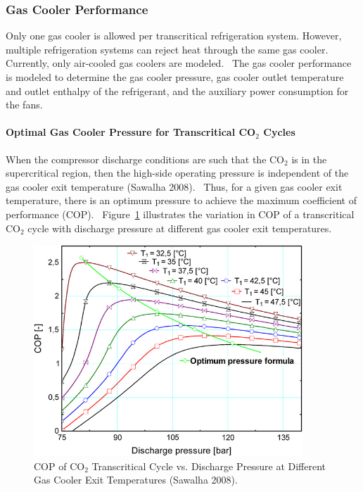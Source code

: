 \subsubsection{Gas Cooler Performance}\label{gas-cooler-performance}

Only one gas cooler is allowed per transcritical refrigeration system. However, multiple refrigeration systems can reject heat through the same gas cooler.~ Currently, only air-cooled gas coolers are modeled.~ The gas cooler performance is modeled to determine the gas cooler pressure, gas cooler outlet temperature and outlet enthalpy of the refrigerant, and the auxiliary power consumption for the fans.

\paragraph{Optimal Gas Cooler Pressure for Transcritical CO\(_{2}\) Cycles}\label{optimal-gas-cooler-pressure-for-transcritical-coux5f2-cycles}

When the compressor discharge conditions are such that the CO\(_{2}\) is in the supercritical region, then the high-side operating pressure is independent of the gas cooler exit temperature (Sawalha 2008).~ Thus, for a given gas cooler exit temperature, there is an optimum pressure to achieve the maximum coefficient of performance (COP).~ Figure~\ref{fig:cop-of-co_2-transcritical-cycle-vs.-discharge} illustrates the variation in COP of a transcritical CO\(_{2}\) cycle with discharge pressure at different gas cooler exit temperatures.

\begin{figure}[hbtp] %
\centering
\includegraphics[width=0.9\textwidth, height=0.9\textheight, keepaspectratio=true]{media/image6342.png}
\caption{COP of CO\(_2\) Transcritical Cycle vs. Discharge Pressure at Different Gas Cooler Exit Temperatures (Sawalha 2008). \protect \label{fig:cop-of-co_2-transcritical-cycle-vs.-discharge}}
\end{figure}

